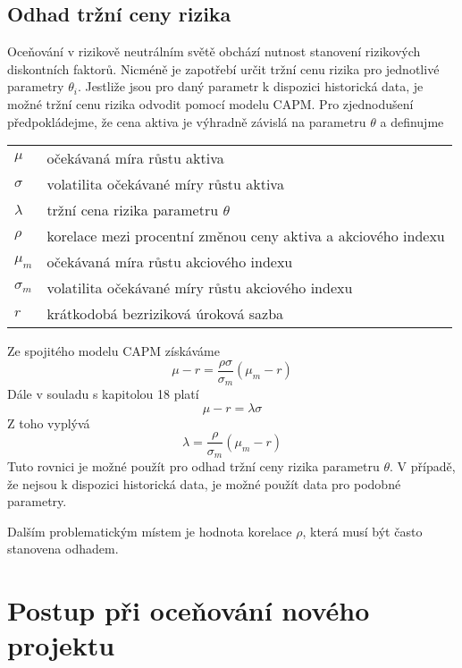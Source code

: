 \documentclass[a4paper]{book}
\begin{document}
\subsection{Odhad tržní ceny rizika}

Oceňování v rizikově neutrálním světě obchází nutnost stanovení rizikových diskontních faktorů. Nicméně je zapotřebí určit tržní cenu rizika pro jednotlivé parametry $\theta_i$. Jestliže jsou pro daný parametr k dispozici historická data, je možné tržní cenu rizika odvodit pomocí modelu CAPM. Pro zjednodušení předpokládejme, že cena aktiva je výhradně závislá na parametru $\theta$ a definujme
\begin{center}
\begin{tabular}{l l}
$\mu$ & očekávaná míra růstu aktiva\\
$\sigma$ & volatilita očekávané míry růstu aktiva\\
$\lambda$ & tržní cena rizika parametru $\theta$\\
$\rho$ & korelace mezi procentní změnou ceny aktiva a akciového indexu\\
$\mu_m$ & očekávaná míra růstu akciového indexu\\
$\sigma_m$ & volatilita očekávané míry růstu akciového indexu\\
$r$ & krátkodobá bezriziková úroková sazba\\
\end{tabular}
\end{center}
Ze spojitého modelu CAPM získáváme
\begin{equation*}
\mu - r = \frac{\rho \sigma}{\sigma_m}(\mu_m - r)
\end{equation*}
Dále v souladu s kapitolou 18 platí
\begin{equation*}
\mu - r = \lambda \sigma
\end{equation*}
Z toho vyplývá
\begin{equation*}
\lambda = \frac{\rho}{\sigma_m}(\mu_m - r)
\end{equation*}
Tuto rovnici je možné použít pro odhad tržní ceny rizika parametru $\theta$. V případě, že nejsou k dispozici historická data, je možné použít data pro podobné parametry.

Dalším problematickým místem je hodnota korelace $\rho$, která musí být často stanovena odhadem.

\section{Postup při oceňování nového projektu}
\end{document}
